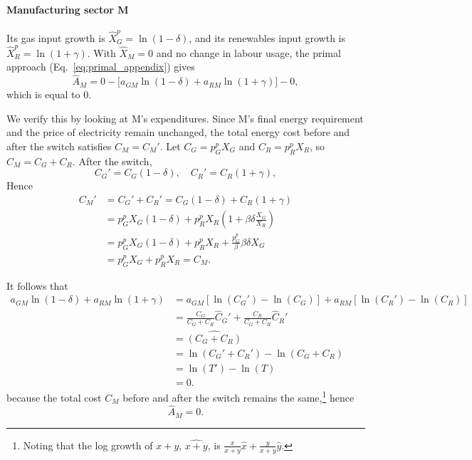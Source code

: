 \documentclass[11pt]{article}
\begin{document}
\paragraph{Manufacturing sector M}
Its gas input growth is $\hat{X}_G^p=\ln(1-\delta)$, and its renewables input growth is $\hat{X}_R^p=\ln(1+\gamma)$. With $\hat{X}_M=0$ and no change in labour usage, the primal approach (Eq.~\ref{eq:primal_appendix}) gives
\[
    \hat{A}_M
= 0
  - \bigl[a_{GM}\ln(1-\delta)
     + a_{RM}\ln(1+\gamma)\bigr]
  - 0,
\]
which is equal to 0. 

We verify this by looking at M's expenditures. Since M's final energy requirement and the price of electricity remain unchanged, the total energy cost before and after the switch satisfies \(C_M = C_M'\). Let \(C_G = p_G^pX_G\) and \(C_R = p_R^pX_R\), so \(C_M = C_G + C_R\). After the switch,
\[
   C_G' = C_G(1-\delta), \quad
   C_R' = C_R(1+\gamma),\]
   Hence
\begin{equation}
\label{eq_cost_argument_M}
\begin{aligned}
         C_M'&=C_G'+C_R'=C_G  (1-\delta)+C_R(1+\gamma)\\&
     =p_G^pX_G  (1-\delta)+p_R^pX_R\left(1+\beta\delta\frac{X_G}{X_R}\right)\\
    &= p_G^pX_G  (1-\delta)+p_R^pX_R+\frac{p_G^p}{\beta}\beta \delta X_G\\
     &= p_G^pX_G +p_R^pX_R
     =C_M.
\end{aligned}
\end{equation}

It follows that
\begin{equation}
 \label{eq_weighted_share_change_cost}
\begin{aligned}
a_{GM} \ln(1-\delta) + a_{RM} \ln(1+\gamma)&= 
a_{GM}\left[ \ln(C_G') - \ln(C_G) \right] + 
a_{RM} \left[ \ln(C_R') - \ln(C_R) \right]\\&= 
\frac{C_G}{C_G + C_R} \hat{C}_G' + 
\frac{C_R}{C_G + C_R} \hat{C}_R'\\
  &=\widehat{(C_G+C_R)}\\
 &=   \ln(C_G' + C_R') - \ln(C_G + C_R) \\
&=\ln(T') - \ln(T)  \\
&= 0.
\end{aligned}
\end{equation}
because the total cost $C_M$ before and after the switch remains the same,\footnote{
Noting that the log growth of $x+y$, $\widehat{x+y}$, is $\frac{x}{x+y} \hat{x} + \frac{y}{x+y} \hat{y}$.
}
 hence
\[
    \hat{A}_M=0.
\]
\end{document}

